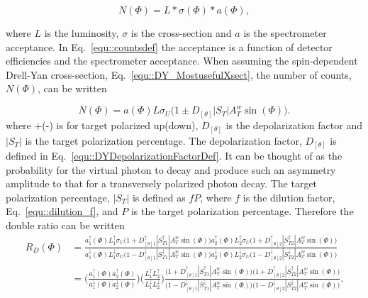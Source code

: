 \begin{equation}
  \label{equ::countsdef}
  N(\Phi) = L * \sigma(\Phi) * a(\Phi),
\end{equation}

\noindent
where $L$ is the luminosity, $\sigma$ is the cross-section and $a$ is the
spectrometer acceptance.  In Eq.~\ref{equ::countsdef} the acceptance is a
function of detector efficiencies and the spectrometer acceptance.  When
assuming the spin-dependent Drell-Yan cross-section,
Eq.~\ref{equ::DY_MostusefulXsect}, the number of counts, $N(\Phi)$, can be
written

\begin{equation}
  \label{equ::spindependentCounts}
  N(\Phi) = a(\Phi)L\sigma_U\Big(1 \pm D_{[\theta]}|S_T|A^w_T\sin(\Phi)\Big).
\end{equation}
\noindent
where +(-) is for target polarized up(down), $D_{[\theta]}$ is the
depolarization factor and $|S_T|$ is the target polarization percentage.  The
depolarization factor, $D_{[\theta]}$ is defined in
Eq.~\ref{equ::DYDepolarizationFactorDef}.  It can be thought of as the
probability for the virtual photon to decay and produce such an asymmetry
amplitude to that for a transversely polarized photon decay.  The target
polarization percentage, $|S_T|$ is defined as $fP$, where $f$ is the dilution
factor, Eq.~\ref{equ::dilution_f}, and $P$ is the target polarization
percentage.  Therefore the double ratio can be written
\begin{align}
  R_D(\Phi) &= \frac{ a_1^{\uparrow}(\Phi)L_1^{\uparrow}\sigma_U\Big(1 +
    D_{[\theta]1}^{\uparrow}|S_{T1}^{\uparrow}|A^w_T\sin(\Phi)\Big)
    a_2^{\uparrow}(\Phi)L_2^{\uparrow}\sigma_U\Big(1 +
    D_{[\theta]2}^{\uparrow}|S_{T2}^{\uparrow}|A^w_T\sin(\Phi)\Big) } {
    a_1^{\downarrow}(\Phi)L_1^{\downarrow}\sigma_U\Big(1 -
    D_{[\theta]1}^{\downarrow}|S_{T1}^{\downarrow}|A^w_T\sin(\Phi)\Big)
    a_2^{\downarrow}(\Phi)L_2^{\downarrow}\sigma_U\Big(1 -
    D_{[\theta]2}^{\downarrow}|S_{T2}^{\downarrow}|A^w_T\sin(\Phi)\Big) }
  \\ \nonumber &= \Big(\frac{a_1^{\uparrow}(\Phi)a_2^{\uparrow}(\Phi)}
     {a_1^{\downarrow}(\Phi)a_2^{\downarrow}(\Phi)} \Big)
     \Big(\frac{L_1^{\uparrow}L_2^{\uparrow}}
         {L_1^{\downarrow}L_2^{\downarrow}}\Big)
         \frac{\Big(1+D_{[\theta]1}^{\uparrow}|S_{T1}^{\uparrow}|A^w_T\sin(\Phi)\Big)
           \Big(1+D_{[\theta]2}^{\uparrow}|S_{T2}^{\uparrow}|A^w_T\sin(\Phi)\Big)}
              {\Big(1-D_{[\theta]1}^{\downarrow}|S_{T1}^{\downarrow}|A^w_T\sin(\Phi)\Big)
                \Big(1-D_{[\theta]2}^{\downarrow}|S_{T2}^{\downarrow}|A^w_T\sin(\Phi)\Big)
              }.
\end{align}
